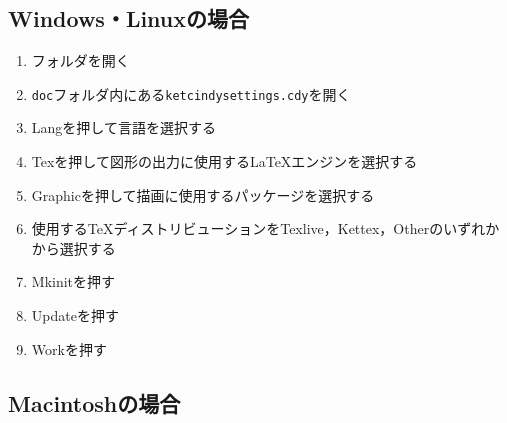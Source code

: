 \subsection{Windows・Linuxの場合}
\begin{enumerate}
    \item {\ketcindy}フォルダを開く
    \item \verb|doc|フォルダ内にある\verb|ketcindysettings.cdy|を開く
    \item Langを押して言語を選択する
    \item Texを押して図形の出力に使用する{\LaTeX}エンジンを選択する
    \item Graphicを押して描画に使用するパッケージを選択する
    \item 使用する{\TeX}ディストリビューションをTexlive，Kettex，Otherのいずれかから選択する
    \item Mkinitを押す
    \item Updateを押す
    \item Workを押す
\end{enumerate}

\subsection{Macintoshの場合}
